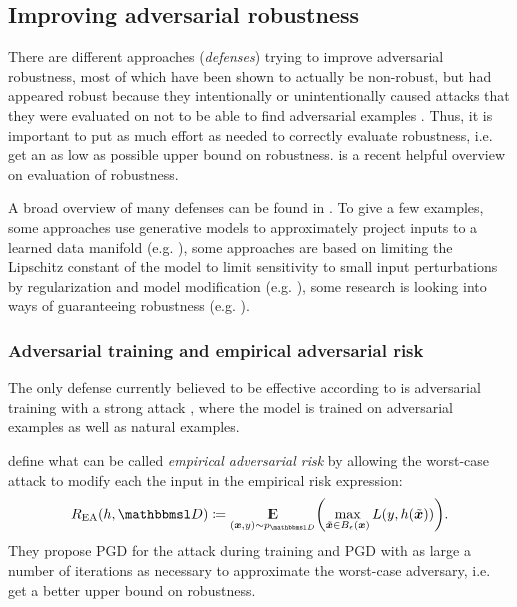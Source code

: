 \documentclass{article}
\begin{document}
\subsection{Improving adversarial robustness}

There are different approaches (\textit{defenses}) trying to improve adversarial robustness, most of which have been shown to actually be non-robust, but had appeared robust because they intentionally or unintentionally caused attacks that they were evaluated on not to be able to find adversarial examples \citep{Carlini:2017:AEANEDBTM,Athalye:2018:OGGFSS,Uesato:2018:ARDEAWA,Carlini:2017:TERNN}.  Thus, it is important to put as much effort as needed to correctly evaluate robustness, i.e. get an as low as possible upper bound on robustness. \citep{Carlini:2019:OEAR} is a recent helpful overview on evaluation of robustness. 

A broad overview of many defenses can be found in \citet{Serban:2018:AECCP}. To give a few examples, some approaches use generative models to approximately project inputs to a learned data manifold (e.g. \citet{Samangouei:2018:DGPCAAAUGM}), some approaches are based on limiting the Lipschitz constant of the model to limit sensitivity to small input perturbations by regularization and model modification (e.g. \citet{Qian:2018:L2NNN}), some research is looking into ways of guaranteeing robustness (e.g. \citet{Cohen:2019:CARRS}).

\subsubsection{Adversarial training and empirical adversarial risk}

The only defense currently believed to be effective according to \citet{Athalye:2018:OGGFSS} is adversarial training \citep{Goodfellow:2014:EHAE} with a strong attack \citep{Madry:2017:TDLMRAA}, where the model is trained on adversarial examples as well as natural examples.

\cite{Madry:2017:TDLMRAA} define what can be called \textit{empirical adversarial risk} by allowing the worst-case attack to modify each the input in the empirical risk expression:
\begin{align}
R_\text{EA}(h,\set D) \coloneqq \E_{(\vec x, y)\sim p_{\set D}} \del{\max_{\tilde{\vec x}\in B_\epsilon(\vec x)} L(y,h(\tilde{\vec x}))} \text{.}
\end{align}
They propose PGD for the attack during training and PGD with as large a number of iterations as necessary to approximate the worst-case adversary, i.e. get a better upper bound on robustness.
\end{document}
